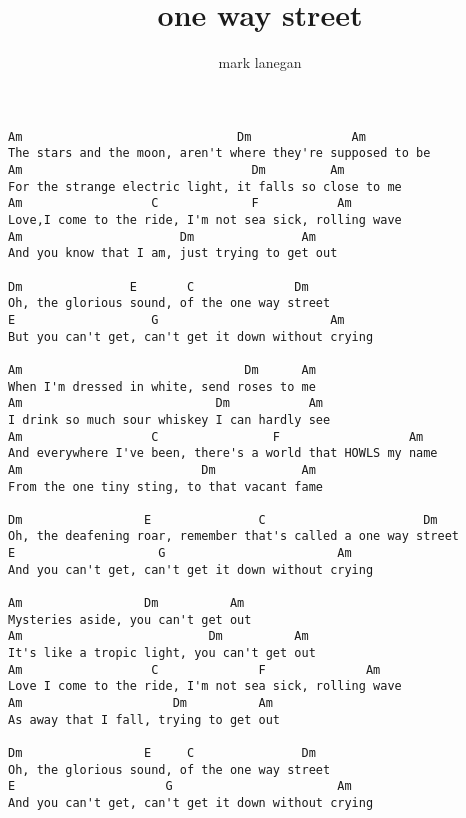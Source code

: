 \author{mark lanegan}
\title{one way street}
\maketitle
\begin{verbatim}
Am                              Dm              Am    
The stars and the moon, aren't where they're supposed to be
Am                                Dm         Am
For the strange electric light, it falls so close to me
Am                  C             F           Am
Love,I come to the ride, I'm not sea sick, rolling wave
Am                      Dm               Am
And you know that I am, just trying to get out

Dm               E       C              Dm
Oh, the glorious sound, of the one way street
E                   G                        Am
But you can't get, can't get it down without crying

Am                               Dm      Am
When I'm dressed in white, send roses to me
Am                           Dm           Am
I drink so much sour whiskey I can hardly see
Am                  C                F                  Am
And everywhere I've been, there's a world that HOWLS my name
Am                         Dm            Am
From the one tiny sting, to that vacant fame

Dm                 E               C                      Dm
Oh, the deafening roar, remember that's called a one way street
E                    G                        Am
And you can't get, can't get it down without crying

Am                 Dm          Am
Mysteries aside, you can't get out
Am                          Dm          Am
It's like a tropic light, you can't get out
Am                  C              F              Am
Love I come to the ride, I'm not sea sick, rolling wave
Am                     Dm          Am
As away that I fall, trying to get out

Dm                 E     C               Dm
Oh, the glorious sound, of the one way street
E                     G                       Am
And you can't get, can't get it down without crying
\end{verbatim}
